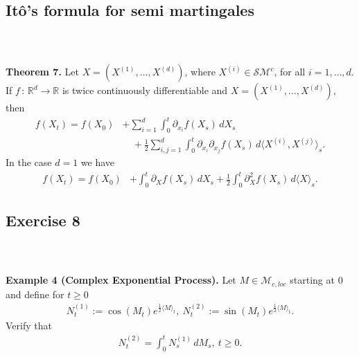 \documentclass{beamer}
\numberwithin{equation}{section}
\newenvironment{frame2}{\begin{frame}\frametitle{{\normalsize \secname} \\ {\large \subsecname}}}{\end{frame}}
\begin{document}
\subsection{Itô's formula for semi martingales}

\begin{frame2}
    \textbf{Theorem 7.}
        Let $X = (X^{(1)},\ldots,X^{(d)})$, where $X^{(i)} \in \mathcal{SM}^c$, for all $i = 1,\ldots,d$.
        If $f \, : \, \mathbb{R}^d \rightarrow \mathbb{R}$ is twice continuously differentiable and $X = (X^{(1)},\ldots,X^{(d)})$, then
        \begin{align*}
            f(X_t) = f(X_0) &+ \sum_{i = 1}^d\int_0^t\partial_{x_i}f(X_s)\, dX_s \\
            &\quad+ \frac{1}{2}\sum_{i,j=1}^d\int_0^t\partial_{x_i}\partial_{x_j}f(X_s)\, d \langle X^{(i)},X^{(j)}\rangle_s.
        \end{align*}
        In the case $d = 1$ we have
        \begin{align*}
            f(X_t) = f(X_0) &+ \int_0^t\partial_{X} f(X_s)\, dX_s + \frac{1}{2}\int_0^t\partial^2_X f(X_s)\, d \langle X \rangle_s.
        \end{align*}
\end{frame2}

\subsection{Exercise 8}

\begin{frame2}
    \textbf{Example 4 (Complex Exponential Process).}
    Let $M \in \mathcal{M}_{c,loc}$ starting at 0 and define for $t \geq 0$
    \begin{align}
        N_t^{(1)} := \cos(M_t)e^{\frac{1}{2}\langle M \rangle_t},\ N_t^{(2)} := \sin(M_t)e^{\frac{1}{2}\langle M \rangle_t}.
    \end{align}
    Verify that
    \begin{align}
        N_t^{(2)} = \int_0^t N_s^{(1)} \, dM_s, \ t \geq 0.
    \end{align}
\end{frame2}
\end{document}
